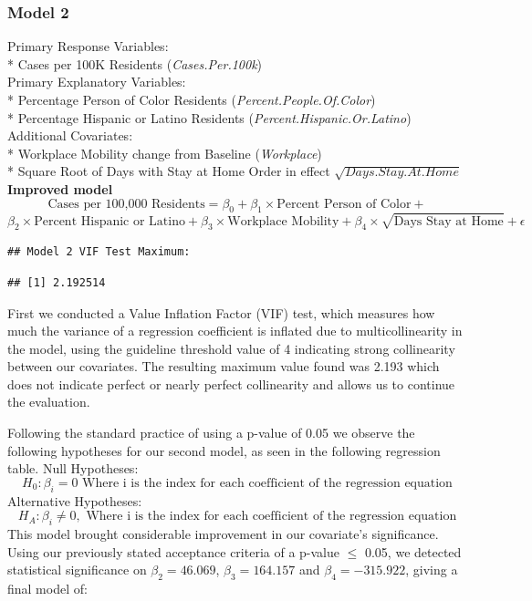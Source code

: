 \documentclass[
]{article}
\begin{document}
\hypertarget{model-2}{%
\subsubsection{Model 2}\label{model-2}}

Primary Response Variables:\\
* Cases per 100K Residents (\emph{Cases.Per.100k})\\
Primary Explanatory Variables:\\
* Percentage Person of Color Residents
(\emph{Percent.People.Of.Color})\\
* Percentage Hispanic or Latino Residents
(\emph{Percent.Hispanic.Or.Latino})\\
Additional Covariates:\\
* Workplace Mobility change from Baseline (\emph{Workplace})\\
* Square Root of Days with Stay at Home Order in effect
\(\sqrt{Days.Stay.At.Home}\)\\

\textbf{Improved model}
\[\text{Cases per 100,000 Residents} = \beta_0 + \beta_1 \times \text{Percent Person of Color} +\]
\[\beta_2 \times \text{Percent Hispanic or Latino} +  \beta_3 \times \text{Workplace Mobility} + \beta_4 \times \sqrt{\text{Days Stay at Home}} + \epsilon \]

\begin{verbatim}
## Model 2 VIF Test Maximum:
\end{verbatim}

\begin{verbatim}
## [1] 2.192514
\end{verbatim}

First we conducted a Value Inflation Factor (VIF) test, which measures
how much the variance of a regression coefficient is inflated due to
multicollinearity in the model, using the guideline threshold value of 4
indicating strong collinearity between our covariates. The resulting
maximum value found was 2.193 which does not indicate perfect or nearly
perfect collinearity and allows us to continue the evaluation.

Following the standard practice of using a p-value of 0.05 we observe
the following hypotheses for our second model, as seen in the following
regression table. Null Hypotheses:
\[H_0 : \beta_i = 0 \text{ Where i is the index for each coefficient of the regression equation}\]
Alternative Hypotheses:
\[H_A : \beta_i \neq 0, \text{ Where i is the index for each coefficient of the regression equation}\]
This model brought considerable improvement in our covariate's
significance. Using our previously stated acceptance criteria of a
p-value \(\le\) 0.05, we detected statistical significance on
\(\beta_2 = 46.069\), \(\beta_3 = 164.157\) and \(\beta_ 4 = -315.922\),
giving a final model of:
\end{document}
